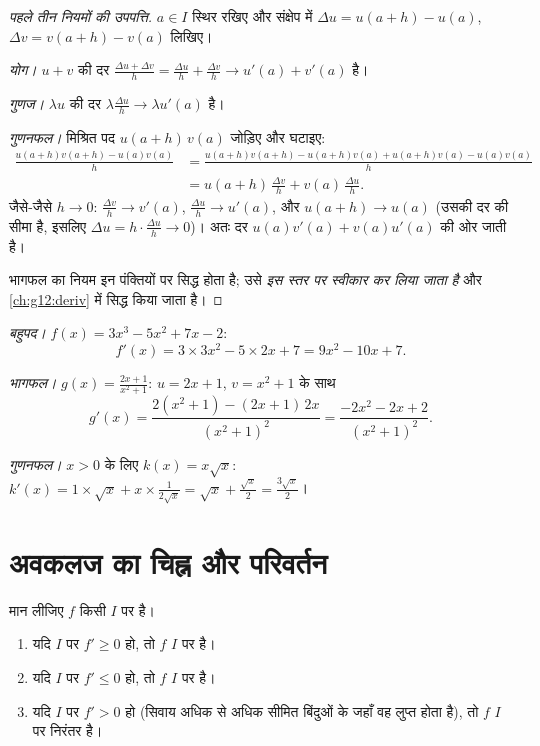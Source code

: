 \begin{proof}[पहले तीन नियमों की उपपत्ति]
$a \in I$ स्थिर रखिए और संक्षेप में $\Delta u = u(a+h) - u(a)$, $\Delta v = v(a+h) - v(a)$ लिखिए।

\emph{योग।} $u + v$ की दर $\frac{\Delta u + \Delta v}{h} = \frac{\Delta u}{h} + \frac{\Delta v}{h}
\to u'(a) + v'(a)$ है।

\emph{गुणज।} $\lambda u$ की दर $\lambda \frac{\Delta u}{h} \to \lambda u'(a)$ है।

\emph{गुणनफल।} मिश्रित पद $u(a+h)\,v(a)$ जोड़िए और घटाइए:
\begin{align*}
\frac{u(a+h)v(a+h) - u(a)v(a)}{h}
&= \frac{u(a+h)v(a+h) - u(a+h)v(a) + u(a+h)v(a) - u(a)v(a)}{h}\\
&= u(a+h)\,\frac{\Delta v}{h} + v(a)\,\frac{\Delta u}{h}.
\end{align*}
जैसे-जैसे $h \to 0$: $\frac{\Delta v}{h} \to v'(a)$, $\frac{\Delta u}{h} \to
u'(a)$, और $u(a+h) \to u(a)$ (उसकी दर की सीमा है, इसलिए $\Delta u = h \cdot \frac{\Delta u}{h} \to 0$)।
अतः दर $u(a)v'(a) + v(a)u'(a)$ की ओर जाती है।

भागफल का नियम इन पंक्तियों पर सिद्ध होता है; उसे \emph{इस स्तर पर स्वीकार
कर लिया जाता है} और \cref{ch:g12:deriv} में सिद्ध किया जाता है।
\end{proof}

\begin{example}\label{ex:g11:deriv:computations}
\emph{बहुपद।} $f(x) = 3x^3 - 5x^2 + 7x - 2$:
\[
f'(x) = 3 \times 3x^2 - 5 \times 2x + 7 = 9x^2 - 10x + 7 .
\]

\emph{भागफल।} $g(x) = \frac{2x+1}{x^2+1}$: $u = 2x + 1$, $v = x^2
+ 1$ के साथ
\[
g'(x) = \frac{2(x^2+1) - (2x+1)\,2x}{(x^2+1)^2}
= \frac{-2x^2 - 2x + 2}{(x^2+1)^2}.
\]

\emph{गुणनफल।} $x > 0$ के लिए $k(x) = x\sqrt x$: $k'(x) = 1 \times \sqrt x + x \times \frac{1}{2\sqrt x}
= \sqrt x + \frac{\sqrt x}{2} = \frac{3\sqrt x}{2}$।
\end{example}

\section{अवकलज का चिह्न और परिवर्तन}

\begin{theorem}[अवकलज और परिवर्तन]\label{thm:g11:deriv:variations}
मान लीजिए $f$ किसी  $I$ पर  है।
\begin{enumerate}
  \item यदि $I$ पर $f' \geq 0$ हो, तो $f$ $I$ पर  है।
  \item यदि $I$ पर $f' \leq 0$ हो, तो $f$ $I$ पर  है।
  \item यदि $I$ पर $f' > 0$ हो (सिवाय अधिक से अधिक सीमित बिंदुओं के जहाँ वह
        लुप्त होता है), तो $f$ $I$ पर निरंतर  है।
\end{enumerate}
\end{theorem}

